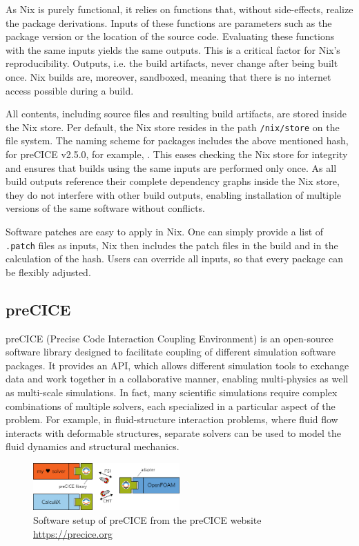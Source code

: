 \documentclass{eceasst}
\begin{document}
As Nix is purely functional, it relies on functions that, without side-effects, realize the package derivations.
Inputs of these functions are parameters such as the package version or the location of the source code.
Evaluating these functions with the same inputs yields the same outputs.
This is a critical factor for Nix's reproducibility.
Outputs, i.e. the build artifacts, never change after being built once.
Nix builds are, moreover, sandboxed, meaning that there is no internet access possible during a build.

All contents, including source files and resulting build artifacts, are stored inside the Nix store.
Per default, the Nix store resides in the path \texttt{/nix/store} on the file system.
The naming scheme for packages includes the above mentioned hash, for preCICE v2.5.0, for example,
.
This eases checking the Nix store for integrity and ensures that builds using the same inputs are performed only once.
As all build outputs reference their complete dependency graphs inside the Nix store, they do not interfere with other build outputs, enabling installation of multiple versions of the same software without conflicts.

Software patches are easy to apply in Nix.
One can simply provide a list of \texttt{.patch} files as inputs, Nix then includes the patch files in the build and in the calculation of the hash.
Users can override all inputs, so that every package can be flexibly adjusted.


\subsection{preCICE}

preCICE (Precise Code Interaction Coupling Environment) is an open-source software library designed to facilitate coupling of different simulation software packages.
It provides an API, which allows different simulation tools to exchange data and work together in a collaborative manner, enabling multi-physics as well as multi-scale simulations.
In fact, many scientific simulations require complex combinations of multiple solvers, each specialized in a particular aspect of the problem.
For example, in fluid-structure interaction problems, where fluid flow interacts with deformable structures, separate solvers can be used to model the fluid dynamics and structural mechanics.

\begin{figure}
    \centering
    \includegraphics[width=0.5\textwidth]{figures/precice.png}
    \caption{Software setup of preCICE from the preCICE website \url{https://precice.org}}
    \label{fig:precice}
\end{figure}
\end{document}
